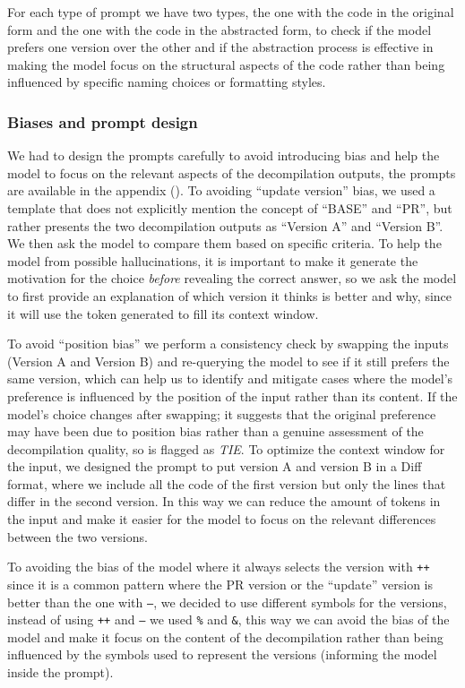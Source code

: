 For each type of prompt we have two types, the one with the code in the original form and the one with the code in the abstracted form, to check if the model prefers one version over the other and if the abstraction process is effective in making the model focus on the structural aspects of the code rather than being influenced by specific naming choices or formatting styles.

\subsubsection{Biases and prompt design}

We had to design the prompts carefully to avoid introducing bias and help the model to focus on the relevant aspects of the decompilation outputs, the prompts are available in the appendix ().
To avoiding ``update version'' bias, we used a template that does not explicitly mention the concept of ``BASE'' and ``\ac{PR}'', but rather presents the two decompilation outputs as ``Version A'' and ``Version B''. We then ask the model to compare them based on specific criteria.
To help the model from possible hallucinations, it is important to make it generate the motivation for the choice \emph{before} revealing the correct answer, so we ask the model to first provide an explanation of which version it thinks is better and why, since it will use the token generated to fill its context window.

To avoid ``position bias'' we perform a consistency check by swapping the inputs (Version A and Version B) and re-querying the model to see if it still prefers the same version, which can help us to identify and mitigate cases where the model's preference is influenced by the position of the input rather than its content. If the model's choice changes after swapping; it suggests that the original preference may have been due to position bias rather than a genuine assessment of the decompilation quality, so is flagged as \emph{TIE}.
To optimize the context window for the input, we designed the prompt to put version A and version B in a Diff format, where we include all the code of the first version but only the lines that differ in the second version. In this way we can reduce the amount of tokens in the input and make it easier for the model to focus on the relevant differences between the two versions.

To avoiding the bias of the model where it always selects the version with \texttt{++} since it is a common pattern where the \ac{PR} version or the ``update'' version is better than the one with \texttt{--},
we decided to use different symbols for the versions, instead of using \texttt{++} and \texttt{--} we used \texttt{\%} and \texttt{\&}, this way we can avoid the bias of the model and make it focus on the content of the decompilation rather than being influenced by the symbols used to represent the versions (informing the model inside the prompt).

